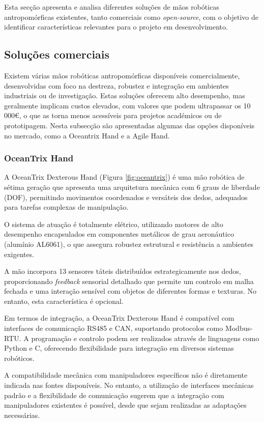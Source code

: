 Esta secção apresenta e analisa diferentes soluções de mãos robóticas antropomórficas existentes, tanto comerciais como \textit{open-source}, com o objetivo de identificar características relevantes para o projeto em desenvolvimento.

\subsection{Soluções comerciais}

Existem várias mãos robóticas antropomórficas disponíveis comercialmente, desenvolvidas com foco na destreza, robustez e integração em ambientes industriais ou de investigação. Estas soluções oferecem alto desempenho, mas geralmente implicam custos elevados, com valores que podem ultrapassar os 10 000€, o que as torna menos acessíveis para projetos académicos ou de prototipagem. Nesta subsecção são apresentadas algumas das opções disponíveis no mercado, como a Oceantrix Hand e a Agile Hand.

\subsubsection{OceanTrix Hand}

A OceanTrix Dexterous Hand (Figura \ref{fig:oceantrix}) é uma mão robótica de sétima geração que apresenta uma arquitetura mecânica com 6 graus de liberdade (DOF), permitindo movimentos coordenados e versáteis dos dedos, adequados para tarefas complexas de manipulação.

O sistema de atuação é totalmente elétrico, utilizando motores de alto desempenho encapsulados em componentes metálicos de grau aeronáutico (alumínio AL6061), o que assegura robustez estrutural e resistência a ambientes exigentes.

A mão incorpora 13 sensores táteis distribuídos estrategicamente nos dedos, proporcionando \textit{feedback} sensorial detalhado que permite um controlo em malha fechada e uma interação sensível com objetos de diferentes formas e texturas. No entanto, esta característica é opcional.

Em termos de integração, a OceanTrix Dexterous Hand é compatível com interfaces de comunicação RS485 e CAN, suportando protocolos como Modbus-RTU. A programação e controlo podem ser realizados através de linguagens como Python e C, oferecendo flexibilidade para integração em diversos sistemas robóticos.

A compatibilidade mecânica com manipuladores específicos não é diretamente indicada nas fontes disponíveis. No entanto, a utilização de interfaces mecânicas padrão e a flexibilidade de comunicação sugerem que a integração com manipuladores existentes é possível, desde que sejam realizadas as adaptações necessárias\cite{oceantrix}.

